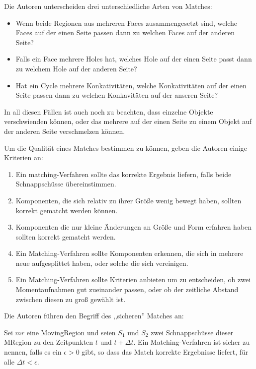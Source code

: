 Die Autoren unterscheiden drei unterschiedliche Arten von Matches:

\begin{itemize}
\item Wenn beide Regionen aus mehreren Faces zusammengesetzt sind, welche Faces auf der einen Seite passen dann zu welchen Faces auf der anderen Seite?
\item Falls ein Face mehrere Holes hat, welches Hole auf der einen Seite passt dann zu welchem Hole auf der anderen Seite?
\item Hat ein Cycle mehrere Konkativitäten, welche Konkativitäten auf der einen Seite passen dann zu welchen Konkavitäten auf der anseren Seite?
\end{itemize}

In all diesen Fällen ist auch noch zu beachten, dass einzelne Objekte verschwienden können, oder das mehrere auf der einen Seite zu einem Objekt auf der anderen Seite verschmelzen können.

Um die Qualität eines Matches bestimmen zu können, geben die Autoren einige Kriterien an:

\begin{enumerate}
\item Ein matching-Verfahren sollte das korrekte Ergebnis liefern, falls beide Schnappschüsse übereinstimmen.
\item Komponenten, die sich relativ zu ihrer Größe wenig bewegt haben, sollten korrekt gematcht werden können.
\item Komponenten die nur kleine Änderungen an Größe und Form erfahren haben sollten korrekt gematcht werden.
\item Ein Matching-Verfahren sollte Komponenten erkennen, die sich in mehrere neue aufgesplittet haben, oder solche die sich vereinigen.
\item Ein Matching-Verfahren sollte Kriterien anbieten um zu entscheiden, ob zwei Momentaufnahmen gut zueinander passen, oder ob der zeitliche Abstand zwischen diesen zu groß gewählt ist.
\end{enumerate}

Die Autoren führen den Begriff des ,,sicheren'' Matches an:

Sei $mr$ eine MovingRegion und seien $S_1$ und $S_2$ zwei Schnappschüsse dieser MRegion zu den Zeitpunkten $t$ und $t+\Delta t$. Ein Matching-Verfahren ist sicher zu nennen, falls es ein $\epsilon >0$ gibt, so dass das Match korrekte Ergebnisse liefert, für alle $\Delta t < \epsilon$.

